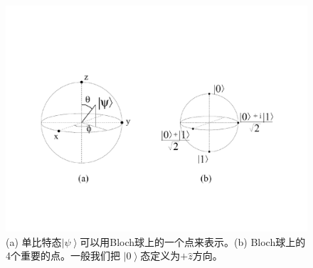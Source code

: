         \begin{figure}[htbp]
            \begin{center}
              \includegraphics[width= 0.8\columnwidth]{figures/bloch.pdf}
              \caption{(a) 单比特态$ \left\vert \psi \right\rangle$可以用Bloch球上的一个点来表示。(b) Bloch球上的4个重要的点。一般我们把 $\left\vert 0 \right\rangle$态定义为$+\hat{z}$方向。
              }
              \label{bloch}
            \end{center}
        \end{figure}

